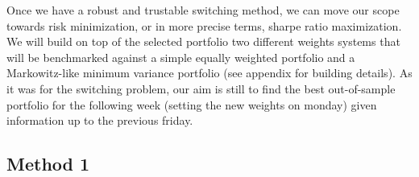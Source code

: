 \documentclass[a4paper]{article}
\begin{document}
Once we have a robust and trustable switching method, we can move our scope towards risk minimization, or in more precise terms, sharpe ratio maximization. We will build on top of the selected portfolio two different weights systems that will be benchmarked against a simple equally weighted portfolio and a Markowitz-like minimum variance portfolio (see appendix for building details). As it was for the switching problem, our aim is still to find the best out-of-sample portfolio for the following week (setting the new weights on monday) given information up to the previous friday. \\

\subsection*{Method 1}
\end{document}
